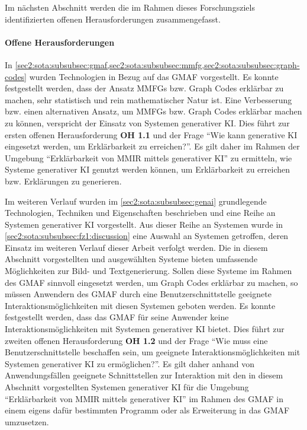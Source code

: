 Im nächsten Abschnitt werden die im Rahmen dieses Forschungsziels identifizierten offenen Herausforderungen zusammengefasst.

\paragraph{Offene Herausforderungen}
\label{sec2:sota:par:fz1:open-challenges}
In \cref{sec2:sota:subsubsec:gmaf,sec2:sota:subsubsec:mmfg,sec2:sota:subsubsec:graph-codes} wurden Technologien in Bezug auf das GMAF vorgestellt.
Es konnte festgestellt werden, dass der Ansatz MMFGs bzw. Graph Codes erklärbar zu machen, sehr statistisch und rein mathematischer Natur ist.
Eine Verbesserung bzw. einen alternativen Ansatz, um MMFGs bzw. Graph Codes erklärbar machen zu können, verspricht der Einsatz von Systemen generativer KI.
Dies führt zur ersten offenen Herausforderung \textbf{OH 1.1} und der Frage \enquote{Wie kann generative KI eingesetzt werden, um Erklärbarkeit zu erreichen?}.
Es gilt daher im Rahmen der Umgebung \enquote{Erklärbarkeit von MMIR mittels generativer KI} zu ermitteln, wie Systeme generativer KI genutzt werden können, um Erklärbarkeit zu erreichen bzw. Erklärungen zu generieren.

Im weiteren Verlauf wurden im \cref{sec2:sota:subsubsec:genai} grundlegende Technologien, Techniken und Eigenschaften beschrieben und eine Reihe an Systemen generativer KI vorgestellt.
Aus dieser Reihe an Systemen wurde in \cref{sec2:sota:subsubsec:fz1:discussion} eine Auswahl an Systemen getroffen, deren Einsatz im weiteren Verlauf dieser Arbeit verfolgt werden.
Die in diesem Abschnitt vorgestellten und ausgewählten Systeme bieten umfassende Möglichkeiten zur Bild- und Textgenerierung.
Sollen diese Systeme im Rahmen des GMAF sinnvoll eingesetzt werden, um Graph Codes erklärbar zu machen, so müssen Anwendern des GMAF durch eine Benutzerschnittstelle geeignete Interaktionsmöglichkeiten mit diesen Systemen geboten werden.
Es konnte festgestellt werden, dass das GMAF für seine Anwender keine Interaktionsmöglichkeiten mit Systemen generativer KI bietet.
Dies führt zur zweiten offenen Herausforderung \textbf{OH 1.2} und der Frage \enquote{Wie muss eine Benutzerschnittstelle beschaffen sein, um geeignete Interaktionsmöglichkeiten mit Systemen generativer KI zu ermöglichen?}.
Es gilt daher anhand von Anwendungsfällen geeignete Schnittstellen zur Interaktion mit den in diesem Abschnitt vorgestellten Systemen generativer KI für die Umgebung \enquote{Erklärbarkeit von MMIR mittels generativer KI} im Rahmen des GMAF in einem eigens dafür bestimmten Programm oder als Erweiterung in das GMAF umzusetzen.

